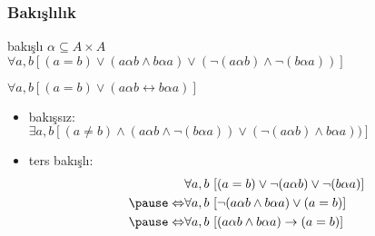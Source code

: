 \documentclass[dvipsnames]{beamer}
\theoremstyle{definition}
\theoremstyle{example}
\theoremstyle{plain}
\begin{document}
\begin{frame}
  \frametitle{Bakışlılık}

  \begin{block}{bakışlı}
    $\alpha \subseteq A \times A$\\
    $\forall a,b [(a=b) \vee (a \alpha b \wedge b \alpha a)
                        \vee (\neg(a \alpha b) \wedge \neg(b \alpha a))]$

    \pause
    \medskip
    $\forall a,b [(a=b) \vee (a \alpha b \leftrightarrow b \alpha a)]$
  \end{block}

  \pause
  \begin{itemize}

    \item bakışsız:\\
      $\exists a,b [(a \neq b) \wedge (a \alpha b \wedge \neg(b \alpha a))
                               \vee (\neg (a \alpha b) \wedge b \alpha a))]$

    \pause
    \item ters bakışlı:
    \begin{eqnarray*}
                      & \forall a,b~
                    [(a=b) \vee \neg(a \alpha b) \vee \neg(b \alpha a)]\\\pause
      \Leftrightarrow & \forall a,b~
                    [\neg(a \alpha b \wedge b \alpha a) \vee (a=b)]\\\pause
      \Leftrightarrow & \forall a,b~
                    [(a \alpha b \wedge b \alpha a) \rightarrow (a=b)]
    \end{eqnarray*}
  \end{itemize}
\end{frame}
%
%
%
\end{document}
